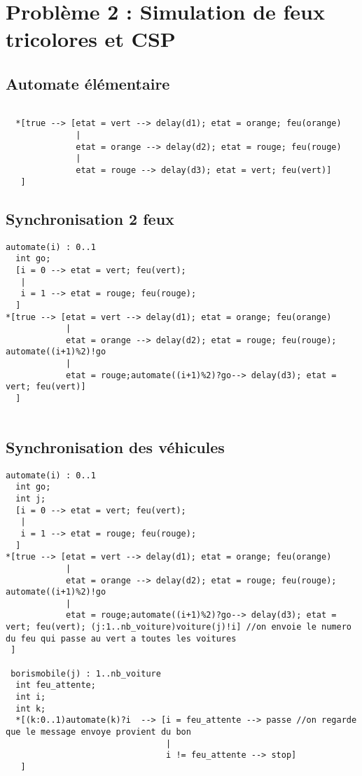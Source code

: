 \documentclass[a4paper]{article}
\begin{document}
\section{Problème 2 : Simulation de feux tricolores et CSP}

\subsection{Automate élémentaire}

\begin{lstlisting}[breaklines=true, frame=single, basicstyle=\footnotesize]
  
  *[true --> [etat = vert --> delay(d1); etat = orange; feu(orange) 
              |
              etat = orange --> delay(d2); etat = rouge; feu(rouge) 
              |
              etat = rouge --> delay(d3); etat = vert; feu(vert)]
   ]
\end{lstlisting}

\subsection{Synchronisation 2 feux}

\begin{lstlisting}[breaklines=true, frame=single, basicstyle=\footnotesize]
  automate(i) : 0..1
  int go;
  [i = 0 --> etat = vert; feu(vert);
   |
   i = 1 --> etat = rouge; feu(rouge);
  ]
*[true --> [etat = vert --> delay(d1); etat = orange; feu(orange)
            |
            etat = orange --> delay(d2); etat = rouge; feu(rouge); automate((i+1)%2)!go 
            |
            etat = rouge;automate((i+1)%2)?go--> delay(d3); etat = vert; feu(vert)]
  ]
  
\end{lstlisting}

\subsection{Synchronisation des véhicules}


\begin{lstlisting}[breaklines=true, frame=single, basicstyle=\footnotesize]
  automate(i) : 0..1
  int go;
  int j;
  [i = 0 --> etat = vert; feu(vert); 
   |
   i = 1 --> etat = rouge; feu(rouge);
  ]
*[true --> [etat = vert --> delay(d1); etat = orange; feu(orange) 
            |
            etat = orange --> delay(d2); etat = rouge; feu(rouge); automate((i+1)%2)!go 
            |
            etat = rouge;automate((i+1)%2)?go--> delay(d3); etat = vert; feu(vert); (j:1..nb_voiture)voiture(j)!i] //on envoie le numero du feu qui passe au vert a toutes les voitures
 ]

 borismobile(j) : 1..nb_voiture
  int feu_attente;
  int i;
  int k;
  *[(k:0..1)automate(k)?i  --> [i = feu_attente --> passe //on regarde que le message envoye provient du bon
                                | 
                                i != feu_attente --> stop]
   ]
  
\end{lstlisting}
\end{document}

